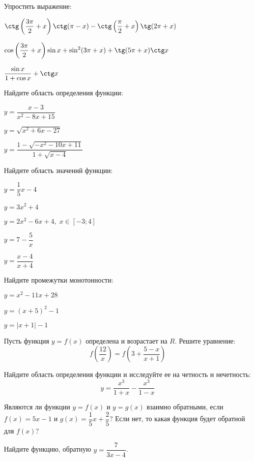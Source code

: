 \begin{class}[number=6]
\begin{listofex}
		\item Упростить выражение:
		\begin{enumcols}[itemcolumns=1]
			\item \( \ctg\left( \dfrac{3\pi}{2}+x \right)\ctg(\pi-x)-\ctg\left( \dfrac{\pi}{2}+x \right)\tg(2\pi+x) \)
			\item \( \cos\left( \dfrac{3\pi}{2}+x \right)\sin x + \sin^2(3\pi+x)+\tg(5\pi+x)\ctg x \)
			\item \( \dfrac{\sin x}{1+\cos x}+\ctg x \)
		\end{enumcols}
		\item {}
		\item {}
	\end{listofex}
\end{class}
\begin{consultation}
	\begin{listofex}
		\item Найдите область определения функции:
		\begin{enumcols}[itemcolumns=3]
			\item \( y=\dfrac{x-3}{x^2-8x+15} \)
			\item \( y=\sqrt{x^2+6x-27} \)
			\item \( y=\dfrac{1-\sqrt{-x^2-10x+11}}{1+\sqrt{x-4}} \)
		\end{enumcols}
		\item Найдите область значений функции:
		\begin{enumcols}[itemcolumns=2]
			\item \( y=\dfrac{1}{5}x-4 \)
			\item \( y=3x^2+4 \)
			\item \( y=2x^2-6x+4,\; x\in[-3;4] \)
			\item \( y=7-\dfrac{5}{x} \)
			\item \( y=\dfrac{x-4}{x+4} \)
		\end{enumcols}
		\item Найдите промежутки монотонности:
		\begin{enumcols}[itemcolumns=3]
			\item \( y=x^2-11x+28 \)
			\item \( y=(x+5)^2-1 \)
			\item \( y=|x+1|-1 \)
		\end{enumcols}
		\item Пусть функция \( y=f(x) \) определена и возрастает на \( R \). Решите уравнение: \[ f\left( \dfrac{12}{x} \right)=f\left( 3+\dfrac{5-x}{x+1} \right) \]
		\item Найдите область определения функции и исследуйте ее на четность и нечетность: \[ y=\dfrac{x^3}{1+x}-\dfrac{x^3}{1-x} \]
		\item Являются ли функции \( y=f(x) \) и \( y=g(x) \) взаимно обратными, если \( f(x)=5x-1 \) и \( g(x)=\dfrac{1}{5}x+\dfrac{2}{5} \)? Если нет, то какая функция будет обратной для \( f(x) \)?
		\item Найдите функцию, обратную \( y=\dfrac{7}{3x-4} \).
	\end{listofex}
\end{consultation}
